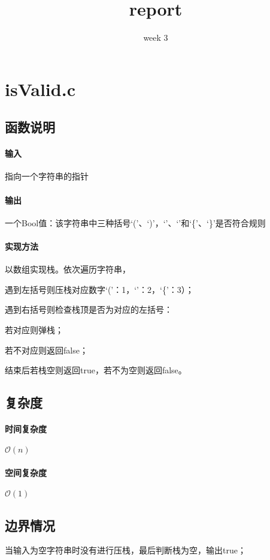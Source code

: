 \documentclass{homework}
\title{report}
\subtitle{week 3}
\begin{document}
\maketitle
\section{isValid.c}
\subsection{函数说明}
\paragraph{输入}
指向一个字符串的指针
\paragraph{输出}
一个Bool值：该字符串中三种括号‘(’、‘)’，‘\lbrack’、‘\rbrack’和‘\{’、‘\}’是否符合规则
\paragraph{实现方法}

以数组实现栈。依次遍历字符串，

遇到左括号则压栈对应数字‘(’：1，‘\lbrack’：2，‘\{’：3）；

遇到右括号则检查栈顶是否为对应的左括号：

\hspace{2em}若对应则弹栈；

\hspace{2em}若不对应则返回false；

结束后若栈空则返回true，若不为空则返回false。
\subsection{复杂度}
\paragraph{时间复杂度}
$\mathcal{O}(n)$
\paragraph{空间复杂度}
$\mathcal{O}(1)$
\subsection{边界情况}

当输入为空字符串时没有进行压栈，最后判断栈为空，输出true；
\end{document}
